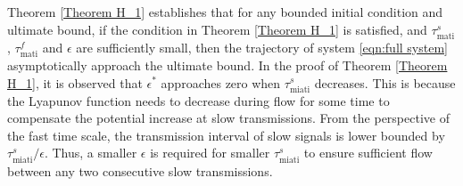 %


Theorem \ref{Theorem H_1} establishes that for any bounded initial condition and ultimate bound, if the condition in Theorem \ref{Theorem H_1} is satisfied, and $\tau_{\text{mati}}^s$, $\tau_{\text{mati}}^f$ and $\epsilon$ are sufficiently small, then the trajectory of system \eqref{eqn:full system} asymptotically approach the ultimate bound.
%
% 
%
In the proof of Theorem \ref{Theorem H_1}, it is observed that $\epsilon^*$ approaches zero when $\tau_{\text{miati}}^s$ decreases. This is because the Lyapunov function needs to decrease during flow for some time to compensate the potential increase at slow transmissions. From the perspective of the fast time scale, the transmission interval of slow signals is lower bounded by $\tau_{\text{miati}}^s / \epsilon$. Thus, a smaller $\epsilon$ is required for smaller $\tau_{\text{miati}}^s$ to ensure sufficient flow between any two consecutive slow transmissions.
%
%
%
%
